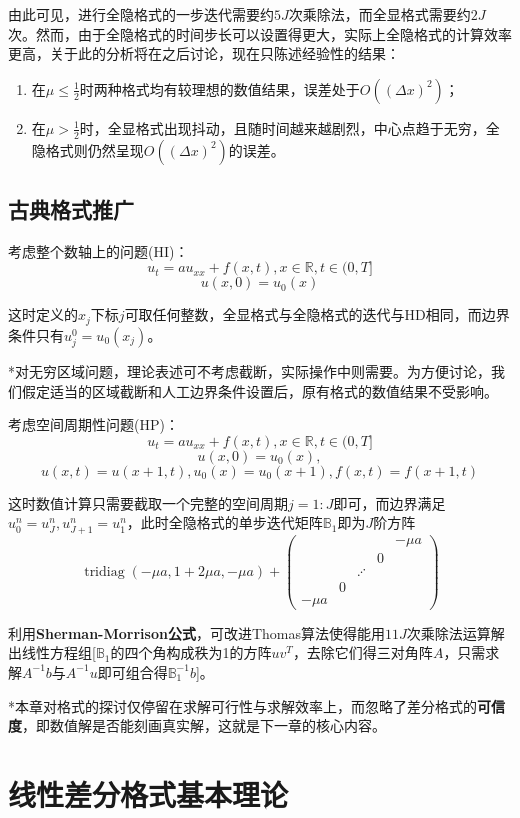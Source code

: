 \documentclass[a4paper,UTF8,fontset=windows]{ctexart}
\DeclareMathOperator{\tridiag}{tridiag}
\begin{document}
由此可见，进行全隐格式的一步迭代需要约$5J$次乘除法，而全显格式需要约$2J$次。然而，由于全隐格式的时间步长可以设置得更大，实际上全隐格式的计算效率更高，关于此的分析将在之后讨论，现在只陈述经验性的结果：
\begin{enumerate}
    \item 在$\mu\le\frac{1}{2}$时两种格式均有较理想的数值结果，误差处于$O((\Delta x)^2)$；
    \item 在$\mu>\frac{1}{2}$时，全显格式出现抖动，且随时间越来越剧烈，中心点趋于无穷，全隐格式则仍然呈现$O((\Delta x)^2)$的误差。
\end{enumerate}

\subsection{古典格式推广}
考虑整个数轴上的问题(HI)：
$$u_t=au_{xx}+f(x,t),x\in\mathbb{R},t\in(0,T]$$
$$u(x,0)=u_0(x)$$

这时定义的$x_j$下标$j$可取任何整数，全显格式与全隐格式的迭代与HD相同，而边界条件只有$u_j^0=u_0(x_j)$。

*对无穷区域问题，理论表述可不考虑截断，实际操作中则需要。为方便讨论，我们假定适当的区域截断和人工边界条件设置后，原有格式的数值结果不受影响。

考虑空间周期性问题(HP)：
$$u_t=au_{xx}+f(x,t),x\in\mathbb{R},t\in(0,T]$$
$$u(x,0)=u_0(x),$$
$$u(x,t)=u(x+1,t),u_0(x)=u_0(x+1),f(x,t)=f(x+1,t)$$

这时数值计算只需要截取一个完整的空间周期$j=1:J$即可，而边界满足$u_0^n=u_J^n,u_{J+1}^n=u_1^n$，此时全隐格式的单步迭代矩阵$\mathbb{B}_1$即为$J$阶方阵
$$\tridiag(-\mu a,1+2\mu a,-\mu a)+\begin{pmatrix}&&&&-\mu a\\ &&&0&\\ &&\iddots &&\\ &0&&& \\ -\mu a&&&&\end{pmatrix}$$

利用\textbf{Sherman-Morrison公式}，可改进Thomas算法使得能用$11J$次乘除法运算解出线性方程组[$\mathbb{B}_1$的四个角构成秩为1的方阵$uv^T$，去除它们得三对角阵$A$，只需求解$A^{-1}b$与$A^{-1}u$即可组合得$\mathbb{B}_1^{-1}b$]。

*本章对格式的探讨仅停留在求解可行性与求解效率上，而忽略了差分格式的\textbf{可信度}，即数值解是否能刻画真实解，这就是下一章的核心内容。

\section{线性差分格式基本理论}
\end{document}
